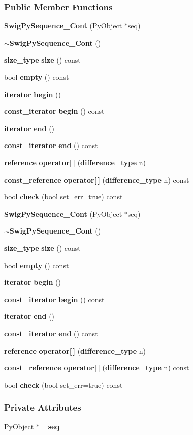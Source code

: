 \subsubsection*{Public Member Functions}
\begin{DoxyCompactItemize}
\item 
{\bf Swig\+Py\+Sequence\+\_\+\+Cont} (Py\+Object $\ast$seq)
\item 
{\bf $\sim$\+Swig\+Py\+Sequence\+\_\+\+Cont} ()
\item 
{\bf size\+\_\+type} {\bf size} () const 
\item 
bool {\bf empty} () const 
\item 
{\bf iterator} {\bf begin} ()
\item 
{\bf const\+\_\+iterator} {\bf begin} () const 
\item 
{\bf iterator} {\bf end} ()
\item 
{\bf const\+\_\+iterator} {\bf end} () const 
\item 
{\bf reference} {\bf operator[$\,$]} ({\bf difference\+\_\+type} n)
\item 
{\bf const\+\_\+reference} {\bf operator[$\,$]} ({\bf difference\+\_\+type} n) const 
\item 
bool {\bf check} (bool set\+\_\+err=true) const 
\item 
{\bf Swig\+Py\+Sequence\+\_\+\+Cont} (Py\+Object $\ast$seq)
\item 
{\bf $\sim$\+Swig\+Py\+Sequence\+\_\+\+Cont} ()
\item 
{\bf size\+\_\+type} {\bf size} () const 
\item 
bool {\bf empty} () const 
\item 
{\bf iterator} {\bf begin} ()
\item 
{\bf const\+\_\+iterator} {\bf begin} () const 
\item 
{\bf iterator} {\bf end} ()
\item 
{\bf const\+\_\+iterator} {\bf end} () const 
\item 
{\bf reference} {\bf operator[$\,$]} ({\bf difference\+\_\+type} n)
\item 
{\bf const\+\_\+reference} {\bf operator[$\,$]} ({\bf difference\+\_\+type} n) const 
\item 
bool {\bf check} (bool set\+\_\+err=true) const 
\end{DoxyCompactItemize}
\subsubsection*{Private Attributes}
\begin{DoxyCompactItemize}
\item 
Py\+Object $\ast$ {\bf \+\_\+seq}
\end{DoxyCompactItemize}


